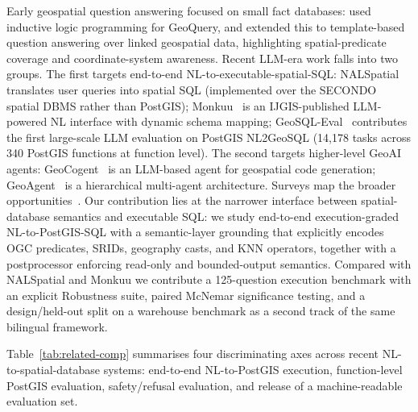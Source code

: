 \documentclass[11pt]{article}
\begin{document}
Early geospatial question answering focused on small fact databases: \citet{zelle1996geoquery} used inductive logic programming for GeoQuery, and \citet{punjani2018geospatial} extended this to template-based question answering over linked geospatial data, highlighting spatial-predicate coverage and coordinate-system awareness. Recent LLM-era work falls into two groups. The first targets end-to-end NL-to-executable-spatial-SQL: NALSpatial~\citep{liu2025nalspatial} translates user queries into spatial SQL (implemented over the SECONDO spatial DBMS rather than PostGIS); Monkuu~\citep{yu2025monkuu} is an IJGIS-published LLM-powered NL interface with dynamic schema mapping; GeoSQL-Eval~\citep{hou2026geosql} contributes the first large-scale LLM evaluation on PostGIS NL2GeoSQL (14{,}178 tasks across 340 PostGIS functions at function level). The second targets higher-level GeoAI agents: GeoCogent~\citep{houcoding2025} is an LLM-based agent for geospatial code generation; GeoAgent~\citep{lin2026geoagent} is a hierarchical multi-agent architecture. Surveys map the broader opportunities~\citep{mai2024foundation}. Our contribution lies at the narrower interface between spatial-database semantics and executable SQL: we study end-to-end execution-graded NL-to-PostGIS-SQL with a semantic-layer grounding that explicitly encodes OGC predicates, SRIDs, geography casts, and KNN operators, together with a postprocessor enforcing read-only and bounded-output semantics. Compared with NALSpatial and Monkuu we contribute a 125-question execution benchmark with an explicit Robustness suite, paired McNemar significance testing, and a design/held-out split on a warehouse benchmark as a second track of the same bilingual framework.

Table~\ref{tab:related-comp} summarises four discriminating axes across recent NL-to-spatial-database systems: end-to-end NL-to-PostGIS execution, function-level PostGIS evaluation, safety/refusal evaluation, and release of a machine-readable evaluation set.
\end{document}
